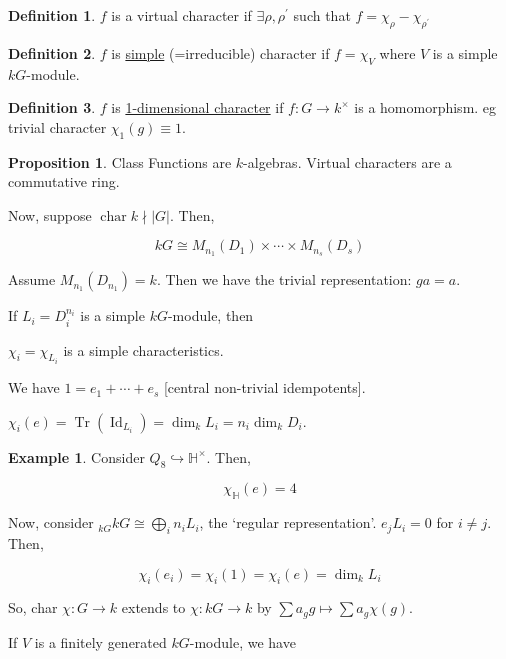 \documentclass{article}
\theoremstyle{definition}
\newtheorem*{example}{Example}
\newtheorem*{definition}{Definition}
\newtheorem{proposition}[theorem]{Proposition}
\newcommand{\Char}{\operatorname{char}}
\newcommand{\Tr}{\operatorname{Tr}}
\begin{document}
\begin{definition}
    \(f\) is a virtual character if \(\exists \rho , \rho ^{\prime} \) such that \(f = \chi _ \rho - \chi _ {\rho ^{\prime} }\) 
\end{definition}

\begin{definition}
    \(f\) is \underline{simple} (=irreducible) character if \(f = \chi _ V\) where \(V\) is a simple \(kG\)-module.
\end{definition}

\begin{definition}
    \(f\) is \underline{1-dimensional character} if \(f : G \to k^\times\) is a homomorphism. eg trivial character \(\chi_1 (g) \equiv 1\). 
\end{definition}

\begin{proposition}
    Class Functions are \(k\)-algebras. Virtual characters are a commutative ring.
\end{proposition}

Now, suppose \(\Char k \nmid \vert G \vert\). Then,

\[
    kG \cong M_{n_1}(D_1) \times \cdots \times M_{n_s}(D_s)
\]

Assume \(M_{n_1}(D_{n_1})=k\). Then we have the trivial representation: \(ga = a\).

If \(L_i = D_i^{n_i}\) is a simple \(kG\)-module, then

\(\chi_i = \chi_{L_i}\) is a simple characteristics.

We have \(1 = e_1 + \cdots + e_s\) [central non-trivial idempotents].

\(\chi_i(e) = \Tr(\operatorname{Id}_{L_i}) = \dim_k L_i = n_i \dim_k D_i\).

\begin{example}
    Consider \(Q_8 \hookrightarrow \mathbb{H} ^\times\). Then,

    \[
        \chi_{\mathbb{H}}(e) = 4
    \]
\end{example}

Now, consider \(_{kG}kG \cong \bigoplus_{i} n_i L_i\), the `regular representation'. \(e_j L_i = 0\) for \(i \neq j\). Then,

\[
    \chi_i(e_i) = \chi_i(1) = \chi_i(e) = \dim_k L_i
\]

So, char \(\chi: G \to k\) extends to \(\chi : kG \to k\) by \(\sum a_g g \mapsto \sum a_g \chi (g)\).  

If \(V\) is a finitely generated \(kG\)-module, we have
\end{document}
